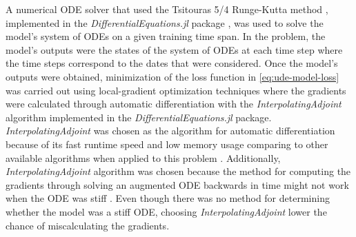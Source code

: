 A numerical \gls{ODE} solver that used the Tsitouras 5/4 Runge-Kutta method \cite{tsitourasRungeKuttaPairs2011}, implemented in the \textit{DifferentialEquations.jl} package \cite{rackauckas2017differentialequations}, was used to solve the model's system of \glspl{ODE} on a given training time span.
In the problem, the model's outputs were the states of the system of \glspl{ODE} at each time step where the time steps correspond to the dates that were considered.
Once the model's outputs were obtained, minimization of the loss function in \autoref{eq:ude-model-loss} was carried out using local-gradient optimization techniques where the gradients were calculated through automatic differentiation with the \textit{InterpolatingAdjoint} algorithm implemented in the \textit{DifferentialEquations.jl} package.
\textit{InterpolatingAdjoint} was chosen as the algorithm for automatic differentiation because of its fast runtime speed and low memory usage comparing to other available algorithms when applied to this problem \cite{rackauckas2017differentialequations}.
Additionally, \textit{InterpolatingAdjoint} algorithm was chosen because the method for computing the gradients through solving an augmented \gls{ODE} backwards in time might not work when the \gls{ODE} was stiff \cite{kimStiffNeuralOrdinary2021}.
Even though there was no method for determining whether the model was a stiff \gls{ODE}, choosing \textit{InterpolatingAdjoint} lower the chance of miscalculating the gradients.

